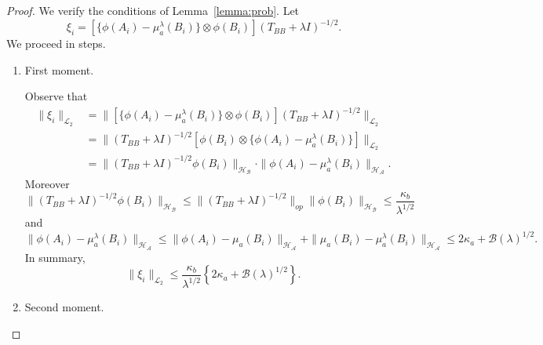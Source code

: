 \begin{proof}
We verify the conditions of Lemma~\ref{lemma:prob}. Let
$$
\xi_i= [\{\phi(A_i)-\mu^{\lambda}_a(B_i)\} \otimes\phi(B_i)] (T_{BB}+\lambda I)^{-1/2}.
$$
We proceed in steps.
\begin{enumerate}
    \item First moment.
    
    Observe that 
\begin{align*}
    \|\xi_i\|_{\mathcal{L}_2}
    &=\|[\{\phi(A_i)-\mu^{\lambda}_a(B_i)\} \otimes\phi(B_i)] (T_{BB}+\lambda I)^{-1/2}\|_{\mathcal{L}_2} \\
    &=\| (T_{BB}+\lambda I)^{-1/2} [\phi(B_i)  \otimes \{\phi(A_i)-\mu^{\lambda}_a(B_i)\}] \|_{\mathcal{L}_2} \\
    &=\| (T_{BB}+\lambda I)^{-1/2} \phi(B_i) \|_{\mathcal{H}_{\mathcal{B}}} \cdot \|\phi(A_i)-\mu^{\lambda}_a(B_i)\|_{\mathcal{H}_{\mathcal{A}}}.
\end{align*}
Moreover
$$
\| (T_{BB}+\lambda I)^{-1/2} \phi(B_i) \|_{\mathcal{H}_{\mathcal{B}}} \leq \|(T_{BB}+\lambda I)^{-1/2}\|_{op} \| \phi(B_i) \|_{\mathcal{H}_{\mathcal{B}}}\leq \frac{\kappa_b}{\lambda^{1/2}}
$$
and
$$
\|\phi(A_i)-\mu^{\lambda}_a(B_i)\|_{\mathcal{H}_{\mathcal{A}}} \leq \|\phi(A_i)-\mu_a(B_i)\|_{\mathcal{H}_{\mathcal{A}}}+\|\mu_a(B_i)-\mu^{\lambda}_a(B_i)\|_{\mathcal{H}_{\mathcal{A}}} \leq 2\kappa_a+\mathcal{B}(\lambda)^{1/2}.
$$
In summary,
$$
\|\xi_i\|_{\mathcal{L}_2} \leq \frac{\kappa_b}{\lambda^{1/2}} \left\{2\kappa_a+\mathcal{B}(\lambda)^{1/2}\right\}.
$$
    \item Second moment.
    

\end{enumerate}
\end{proof}
